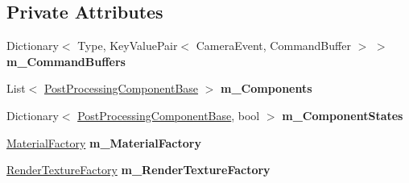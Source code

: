 \subsection*{Private Attributes}
\begin{DoxyCompactItemize}
\item 
\mbox{\label{class_unity_engine_1_1_post_processing_1_1_post_processing_behaviour_ac40000066132d19ddeb89b5adca34a9c}} 
Dictionary$<$ Type, Key\+Value\+Pair$<$ Camera\+Event, Command\+Buffer $>$ $>$ {\bfseries m\+\_\+\+Command\+Buffers}
\item 
\mbox{\label{class_unity_engine_1_1_post_processing_1_1_post_processing_behaviour_a513cbc0e00a3f2859e58b876b46dc9a7}} 
List$<$ \hyperlink{class_unity_engine_1_1_post_processing_1_1_post_processing_component_base}{Post\+Processing\+Component\+Base} $>$ {\bfseries m\+\_\+\+Components}
\item 
\mbox{\label{class_unity_engine_1_1_post_processing_1_1_post_processing_behaviour_a6fe09de3fb35b0bd03fea3bf872c0816}} 
Dictionary$<$ \hyperlink{class_unity_engine_1_1_post_processing_1_1_post_processing_component_base}{Post\+Processing\+Component\+Base}, bool $>$ {\bfseries m\+\_\+\+Component\+States}
\item 
\mbox{\label{class_unity_engine_1_1_post_processing_1_1_post_processing_behaviour_a9a1af34486f0420ea6abf92204746b7d}} 
\hyperlink{class_unity_engine_1_1_post_processing_1_1_material_factory}{Material\+Factory} {\bfseries m\+\_\+\+Material\+Factory}
\item 
\mbox{\label{class_unity_engine_1_1_post_processing_1_1_post_processing_behaviour_a61e80e05217e10d0375d950a288d4c30}} 
\hyperlink{class_unity_engine_1_1_post_processing_1_1_render_texture_factory}{Render\+Texture\+Factory} {\bfseries m\+\_\+\+Render\+Texture\+Factory}
\item 
\mbox{\label{class_unity_engine_1_1_post_processing_1_1_post_processing_behaviour_a1e8d987c41ca013f11713a93406f53bd}} 

\end{DoxyCompactItemize}
